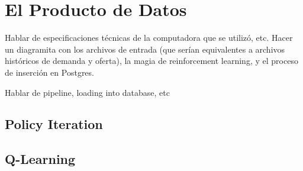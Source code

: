 \chapter{El Producto de Datos}

Hablar de especificaciones t\'ecnicas de la computadora que se utiliz\'o, etc. Hacer un diagramita con los archivos de entrada (que ser\'ian equivalentes a archivos hist\'oricos de demanda y oferta), la magia de reinforcement learning, y el proceso de inserci\'on en Postgres.

Hablar de pipeline, loading into database, etc

\section{Policy Iteration}

\section{Q-Learning}


